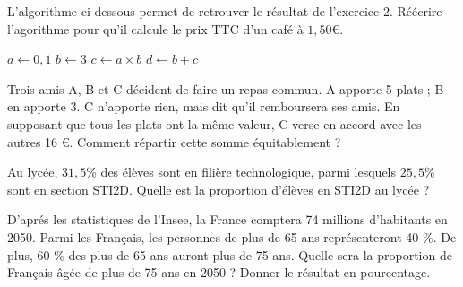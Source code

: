 \documentclass[10pt,a4paper]{article}
\begin{document}
\begin{exo}
    L'algorithme ci-dessous permet de retrouver le résultat de l'exercice 2. Réécrire l'agorithme pour qu'il calcule le prix TTC d'un café à $1,50$€.
   
$a \leftarrow 0,1$
$b \leftarrow  3$
$c \leftarrow a \times b$
$d \leftarrow b + c$

\end{exo}

\begin{exo}
    Trois amis A, B et C décident de faire un repas commun.
A apporte 5 plats ; B en apporte 3. C n'apporte rien, mais dit qu'il remboursera ses amis. En supposant que tous les plats ont la même valeur, C verse en accord avec les autres 16 €. Comment répartir cette somme équitablement ?
\end{exo}

\begin{exo}
Au lycée, $31,5$\% des élèves sont en filière technologique, parmi lesquels $25,5$\% sont en section STI2D. Quelle est la proportion d'élèves en STI2D au lycée ?
\end{exo}

\begin{exo}
D'aprés les statistiques de l'Insee, la France comptera 74 millions d'habitants en 2050. Parmi les Français, les personnes de plus de 65 ans représenteront 40 \%. De plus, 60 \% des plus de 65 ans auront plus de 75 ans. Quelle sera la proportion de Français âgée de plus de 75 ans en 2050 ? Donner le résultat en pourcentage.
\end{exo}
\end{document}
